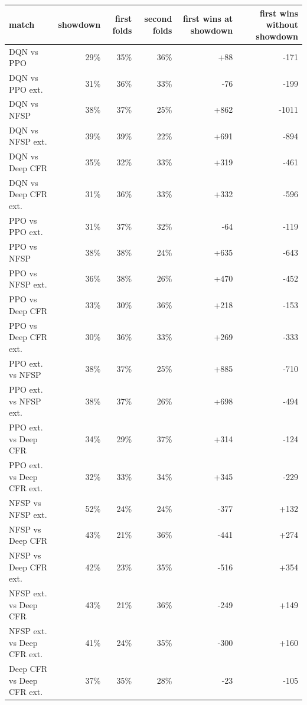 \begin{tabular}{lrrrrr}
\toprule
match & showdown & first folds & second folds & first wins at showdown & first wins without showdown \\
\midrule
DQN vs PPO & 29\% & 35\% & 36\% & +88 & -171 \\
DQN vs PPO ext. & 31\% & 36\% & 33\% & -76 & -199 \\
DQN vs NFSP & 38\% & 37\% & 25\% & +862 & -1011 \\
DQN vs NFSP ext. & 39\% & 39\% & 22\% & +691 & -894 \\
DQN vs Deep CFR & 35\% & 32\% & 33\% & +319 & -461 \\
DQN vs Deep CFR ext. & 31\% & 36\% & 33\% & +332 & -596 \\
PPO vs PPO ext. & 31\% & 37\% & 32\% & -64 & -119 \\
PPO vs NFSP & 38\% & 38\% & 24\% & +635 & -643 \\
PPO vs NFSP ext. & 36\% & 38\% & 26\% & +470 & -452 \\
PPO vs Deep CFR & 33\% & 30\% & 36\% & +218 & -153 \\
PPO vs Deep CFR ext. & 30\% & 36\% & 33\% & +269 & -333 \\
PPO ext. vs NFSP & 38\% & 37\% & 25\% & +885 & -710 \\
PPO ext. vs NFSP ext. & 38\% & 37\% & 26\% & +698 & -494 \\
PPO ext. vs Deep CFR & 34\% & 29\% & 37\% & +314 & -124 \\
PPO ext. vs Deep CFR ext. & 32\% & 33\% & 34\% & +345 & -229 \\
NFSP vs NFSP ext. & 52\% & 24\% & 24\% & -377 & +132 \\
NFSP vs Deep CFR & 43\% & 21\% & 36\% & -441 & +274 \\
NFSP vs Deep CFR ext. & 42\% & 23\% & 35\% & -516 & +354 \\
NFSP ext. vs Deep CFR & 43\% & 21\% & 36\% & -249 & +149 \\
NFSP ext. vs Deep CFR ext. & 41\% & 24\% & 35\% & -300 & +160 \\
Deep CFR vs Deep CFR ext. & 37\% & 35\% & 28\% & -23 & -105 \\
\bottomrule
\end{tabular}
